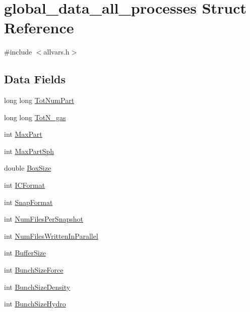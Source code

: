\hypertarget{structglobal__data__all__processes}{
\section{global\_\-data\_\-all\_\-processes Struct Reference}
\label{structglobal__data__all__processes}
}


{\ttfamily \#include $<$allvars.h$>$}

\subsection*{Data Fields}
\begin{DoxyCompactItemize}
\item 
long long \hyperlink{structglobal__data__all__processes_a853bbd3ea833c0a6a57af1434b611868}{TotNumPart}
\item 
long long \hyperlink{structglobal__data__all__processes_a2bb70816a4d5f56e0df2d9b8d706cef2}{TotN\_\-gas}
\item 
int \hyperlink{structglobal__data__all__processes_a413b30e91ae833d0c78b42744a99e67f}{MaxPart}
\item 
int \hyperlink{structglobal__data__all__processes_a43dccd3997af759d43a2f3bcce44a2c4}{MaxPartSph}
\item 
double \hyperlink{structglobal__data__all__processes_ac1b2e52cf547f5b2fe4bdfb0eaafa22f}{BoxSize}
\item 
int \hyperlink{structglobal__data__all__processes_a1c63650e75378a527870ab40f1145df1}{ICFormat}
\item 
int \hyperlink{structglobal__data__all__processes_a6e7d07e68bd6242059d1adac6dabf0d1}{SnapFormat}
\item 
int \hyperlink{structglobal__data__all__processes_a3749135400fbf51c319054233d7a64a7}{NumFilesPerSnapshot}
\item 
int \hyperlink{structglobal__data__all__processes_a0e328240a1fb59c7bf55332a1a691029}{NumFilesWrittenInParallel}
\item 
int \hyperlink{structglobal__data__all__processes_abd0120516eb7fee5a534464546fc5c7f}{BufferSize}
\item 
int \hyperlink{structglobal__data__all__processes_a2f6d4697219a2ec2e3db7f09ab31bcea}{BunchSizeForce}
\item 
int \hyperlink{structglobal__data__all__processes_a9ab84bfa2f66ade551d613aeb3921d76}{BunchSizeDensity}
\item 
int \hyperlink{structglobal__data__all__processes_afe2775a289a902710358d98ba607a0aa}{BunchSizeHydro}

\end{DoxyCompactItemize}
